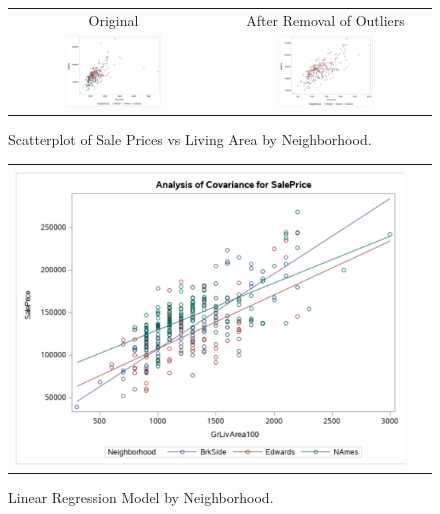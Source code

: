 \documentclass[11pt]{scrartcl} %
\begin{document}
\begin{figure}[H] %
	\centering
	\begin{tabular}{p{} p{}}
\hline	
	\multicolumn{1}{|c|}{Original} &  \multicolumn{1}{|c|}{After Removal of Outliers} \\
		\multicolumn{1}{|c|}{\includegraphics[width=0.48\textwidth]{../graphics/A1NHscat1}} &
		\multicolumn{1}{|c|}{\includegraphics[width=0.48\textwidth]{../graphics/A1NHscat2}}\\
		\hline
	\end{tabular}		
	\caption{Scatterplot of Sale Prices vs Living Area by Neighborhood.} %
	\label{fig:NBscat}
\end{figure}
\begin{figure}[H] %
	\centering
	\begin{tabular}{| p{}|}
	\hline
	\\
	\includegraphics[width=0.95\textwidth]{../graphics/A1NBMLR}\\
	\hline
	\end{tabular}	
	\caption{Linear Regression Model by Neighborhood.} %
	\label{fig:NBLRM}
\end{figure}
\end{document}
